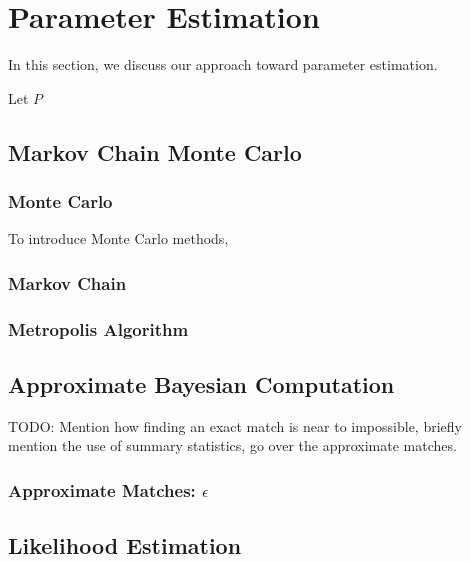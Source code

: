 \section{Parameter Estimation}\label{sec:pe}
In this section, we discuss our approach toward parameter estimation.

Let $P$

\subsection{Markov Chain Monte Carlo}\label{subsec:mcmc}


\subsubsection{Monte Carlo}
To introduce Monte Carlo methods,

\subsubsection{Markov Chain}

\subsubsection{Metropolis Algorithm}

\subsection{Approximate Bayesian Computation}\label{subsec:abc}
TODO: Mention how finding an exact match is near to impossible, briefly mention the use of summary statistics,
go over the approximate matches.

\subsubsection{Approximate Matches: $\epsilon$}

\subsection{Likelihood Estimation}\label{subsec:le}